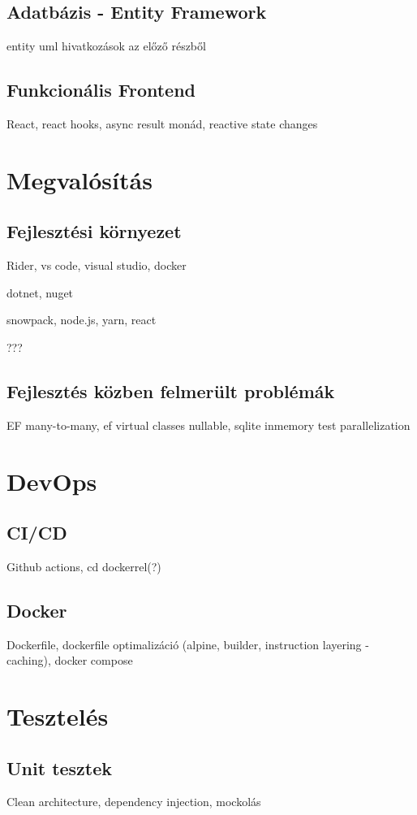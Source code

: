 \subsection{Adatbázis - Entity Framework}
entity uml hivatkozások az előző részből

\subsection{Funkcionális Frontend}
React, react hooks, async result monád, reactive state changes


\section{Megvalósítás}
\subsection{Fejlesztési környezet}
Rider, vs code, visual studio, docker

dotnet, nuget

snowpack, node.js, yarn, react

???

\subsection{Fejlesztés közben felmerült problémák}
EF many-to-many, ef virtual classes nullable, sqlite inmemory test parallelization


\section{DevOps}
\subsection{CI/CD}
Github actions, cd dockerrel(?)
\subsection{Docker}
Dockerfile, dockerfile optimalizáció (alpine, builder, instruction layering - caching), docker compose

\section{Tesztelés}
\subsection{Unit tesztek}
Clean architecture, dependency injection, mockolás

